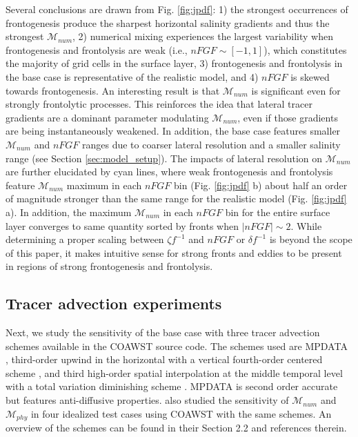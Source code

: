 \documentclass[draft]{agujournal2019}
\begin{document}
Several conclusions are drawn from Fig. \ref{fig:jpdf}: 1) the strongest occurrences of frontogenesis produce the sharpest horizontal salinity gradients and thus the strongest $\mathcal{M}_{num}$, 2) numerical mixing experiences the largest variability when frontogenesis and frontolysis are weak (i.e., $nFGF \sim [-1,1]$), which constitutes the majority of grid cells in the surface layer, 3) frontogenesis and frontolysis in the base case is representative of the realistic model, and 4) $nFGF$ is skewed towards frontogenesis. An interesting result is that $\mathcal{M}_{num}$ is significant even for strongly frontolytic processes. This reinforces the idea that lateral tracer gradients are a dominant parameter modulating $\mathcal{M}_{num}$, even if those gradients are being instantaneously weakened. In addition, the base case features smaller $\mathcal{M}_{num}$ and $nFGF$ ranges due to coarser lateral resolution and a smaller salinity range (see Section \ref{sec:model_setup}). The impacts of lateral resolution on $\mathcal{M}_{num}$ are further elucidated by cyan lines, where weak frontogenesis and frontolysis feature $\mathcal{M}_{num}$ maximum in each $nFGF$ bin (Fig. \ref{fig:jpdf} b) about half an order of magnitude stronger than the same range for the realistic model (Fig. \ref{fig:jpdf} a). In addition, the maximum $\mathcal{M}_{num}$ in each $nFGF$ bin for the entire surface layer converges to same quantity sorted by fronts when $|nFGF| \sim 2$. While determining a proper scaling between $\zeta f^{-1}$ and $nFGF$ or $\delta f^{-1}$ is beyond the scope of this paper, it makes intuitive sense for strong fronts and eddies to be present in regions of strong frontogenesis and frontolysis. 

\subsection{Tracer advection experiments} \label{sec:tadv_exp}

Next, we study the sensitivity of the base case with three tracer advection schemes available in the COAWST source code. The schemes used are MPDATA \cite{smolarkiewicz1984fully, Smolarkiewicz_1998}, third-order upwind in the horizontal with a vertical fourth-order centered scheme \cite<U3HC4>[]{shchepetkin1998quasi}, and third high-order spatial interpolation at the middle temporal level with a total variation diminishing scheme \cite<HSIMT,>[]{wu2010advection, wu2023evaluation}. MPDATA is second order accurate but features anti-diffusive properties.  also studied the sensitivity of $\mathcal{M}_{num}$ and $\mathcal{M}_{phy}$ in four idealized test cases using COAWST with the same schemes. An overview of the schemes can be found in their Section 2.2 and references therein.
\end{document}
